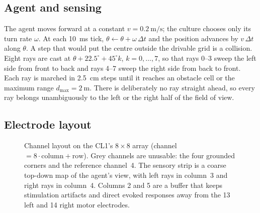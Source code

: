\documentclass[11pt,a4paper]{article}
\begin{document}
\subsection{Agent and sensing}

The agent moves forward at a constant $v=\SI{0.2}{\metre\per\second}$; the culture chooses only
its turn rate $\omega$. At each \SI{10}{\milli\second} tick, $\theta\leftarrow\theta+\omega\,\Delta t$
and the position advances by $v\,\Delta t$ along $\theta$. A step that would put the centre
outside the drivable grid is a collision. Eight rays are cast at
$\theta+22.5^\circ+45^\circ k$, $k=0,\dots,7$, so that rays 0--3 sweep the left side from front
to back and rays 4--7 sweep the right side from back to front. Each ray is marched in
\SI{2.5}{\centi\metre} steps until it reaches an obstacle cell or the maximum range
$d_{\max}=\SI{2}{\metre}$. There is deliberately no ray straight ahead, so every ray belongs
unambiguously to the left or the right half of the field of view.

\subsection{Electrode layout}

\begin{figure}[t]
\centering
{}
\caption{Channel layout on the CL1's $8\times8$ array (channel $=8\cdot\text{column}+\text{row}$).
Grey channels are unusable: the four grounded corners and the reference channel~4. The sensory
strip is a coarse top-down map of the agent's view, with left rays in column~3 and right rays in
column~4. Columns 2 and 5 are a buffer that keeps stimulation artifacts and direct evoked responses
away from the 13 left and 14 right motor electrodes.}
\label{fig:layout}
\end{figure}
\end{document}
